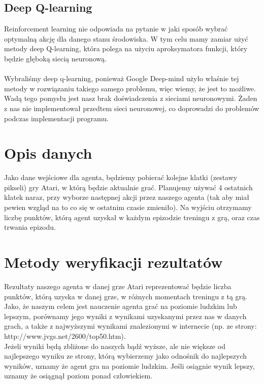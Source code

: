 \documentclass[12pt]{article}
\begin{document}
\subsection{Deep Q-learning}
Reinforcement learning nie odpowiada na pytanie w jaki sposób wybrać optymalną akcję dla danego stanu środowiska. W tym celu mamy zamiar użyć metody deep Q-learning, która polega na użyciu aproksymatora funkcji, który będzie głęboką siecią neuronową. 
\\\\Wybraliśmy deep q-learning, ponieważ Google Deep-mind użyło właśnie tej metody w rozwiązaniu takiego samego problemu, więc wiemy, że jest to możliwe. Wadą tego pomysłu jest nasz brak doświadczenia z sieciami neuronowymi. Żaden z nas nie implementował przedtem sieci neuronowej, co doprowadzi do problemów podczas implementacji programu.

\section{Opis danych}
Jako dane wejściowe dla agenta, będziemy pobierać kolejne klatki (zestawy pikseli) gry Atari, w którą będzie aktualnie grać. Planujemy używać 4 ostatnich klatek naraz, przy wyborze następnej akcji przez naszego agenta (tak aby miał pewien wzgląd na to co się w ostatnim czasie zmieniło). Na wyjściu otrzymamy liczbę punktów, którą agent uzyskał w każdym epizodzie treningu z grą, oraz czas trwania epizodu.


\section{Metody weryfikacji rezultatów}
Rezultaty naszego agenta w danej grze Atari reprezentować będzie liczba punktów, którą uzyska w danej grze, w różnych momentach treningu z tą grą. Jako, że naszym celem jest nauczenie agenta grać na poziomie ludzkim lub lepszym, porównamy jego wyniki z wynikami uzyskanymi przez nas w danych grach, a także z najwyższymi wynikami znalezionymi w internecie (np. ze strony: http://www.jvgs.net/2600/top50.htm). \\ Jeżeli wyniki będą zbliżone do naszych bądź wyższe, ale nie większe od najlepszego wyniku ze strony, którą wybierzemy jako odnośnik do najlepszych wyników, uznamy że agent gra na poziomie ludzkim. Jeśli osiągnie wynik lepszy, uznamy że osiągnął poziom ponad człowiekiem.
\end{document}
